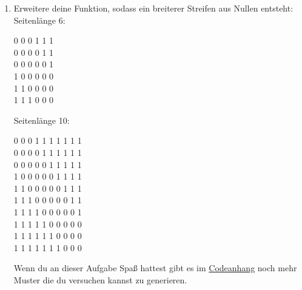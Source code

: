 \documentclass{../../sheet}
\begin{document}
\begin{enumerate}
    \item Erweitere deine Funktion, sodass ein breiterer Streifen aus Nullen entsteht:\\
          Seitenlänge 6:
          \begin{ausgabe}
              0 0 0 1 1 1\\
              0 0 0 0 1 1\\
              0 0 0 0 0 1\\
              1 0 0 0 0 0\\
              1 1 0 0 0 0\\
              1 1 1 0 0 0
          \end{ausgabe}
          Seitenlänge 10:
          \begin{ausgabe}
              0 0 0 1 1 1 1 1 1 1 \\
              0 0 0 0 1 1 1 1 1 1 \\
              0 0 0 0 0 1 1 1 1 1 \\
              1 0 0 0 0 0 1 1 1 1 \\
              1 1 0 0 0 0 0 1 1 1 \\
              1 1 1 0 0 0 0 0 1 1 \\
              1 1 1 1 0 0 0 0 0 1 \\
              1 1 1 1 1 0 0 0 0 0 \\
              1 1 1 1 1 1 0 0 0 0 \\
              1 1 1 1 1 1 1 0 0 0
          \end{ausgabe}
          Wenn du an dieser Aufgabe Spaß hattest gibt es im \hyperlink{Aufgabe_4}{Codeanhang} noch mehr Muster die du versuchen kannst zu generieren.
\end{enumerate}
\end{document}
